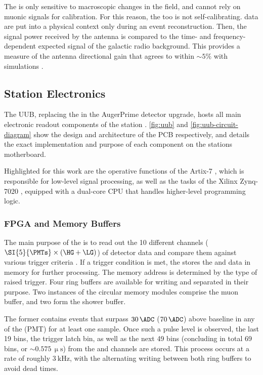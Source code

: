 The \RD is only sensitive to macroscopic changes in the \EM field, and cannot 
rely on muonic signals for calibration. For this reason, the \RD too is not
self-calibrating. \RD data are put into a physical context only during an \EAS
event reconstruction. Then, the signal power received by the antenna is 
compared to the time- and frequency-dependent expected signal of the galactic 
radio background. This provides a measure of the antenna directional gain that 
agrees to within $\sim5\%$ with simulations \cite{huegeRadioDetectorPierre2023,
fodranFirstResultsAugerPrime2022}.

\subsection{Station Electronics}
\label{ssec:uub}

The \acf{UUB}, replacing the \UB in the AugerPrime detector upgrade, hosts all 
main electronic readout components of the station 
\cite{collaborationPierreAugerObservatory2016}. \cref{fig:uub} and 
\cref{fig:uub-circuit-diagram} show the design and architecture of the \UUB 
\acf{PCB} respectively, and \cite{suomijarviNewElectronicsSurface2018} details
the exact implementation and purpose of each component on the stations 
motherboard. 

Highlighted for this work are the operative functions of the Artix-7 \FPGA 
\cite{xilinx7SeriesFPGAs2020}, which is responsible for low-level signal 
processing, as well as the tasks of the Xilinx Zynq-7020 \SOC, equipped with a
dual-core CPU \cite{amdZynq7000SoC2023} that handles higher-level programming 
logic. 

\subsubsection{FPGA and Memory Buffers}
\label{sssec:fpga-buffers}

The main purpose of the \FPGA is to read out the 10 different channels 
($\SI{5}{\PMTs} \times (\HG + \LG)$) of detector data and compare them against 
various trigger criteria \cite{nitzUUBV2Analog18}. If a trigger condition is 
met, the \FPGA stores the \HG and \LG data in memory for further processing. 
The memory address is determined by the type of raised trigger. Four \FIFO ring
buffers are available for writing and separated in their purpose. Two instances
of the circular memory modules comprise the muon buffer, and two form the 
shower buffer. 

The former contains events that surpass $30\,\ADC$ ($70\,\ADC$) above baseline 
in any of the \WCD \LPMTs (\SSD PMT) for at least one sample. Once such a pulse
level is observed, the last 19 bins, the trigger latch bin, as well as the next
49 bins (concluding in total 69 bins, or $\sim0.575\,\upmu\mathrm{s}$) from the
\WCD and \SSD \HG channels are stored.
This process occurs at a rate of roughly $\SI{3}{\kilo\Hz}$, with the \FPGA 
alternating writing between both ring buffers to avoid dead times.

